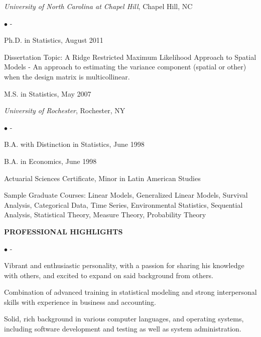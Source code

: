 \documentclass[letterpaper,10pt]{article}
\begin{document}
{\em University of North Carolina at Chapel Hill}, Chapel Hill, NC
\begin{list}{$\bullet$}{\itemsep -5pt \topsep -\parskip}
\item Ph.D. in Statistics, August 2011
\item Dissertation Topic: A Ridge Restricted Maximum Likelihood
  Approach to Spatial Models - An approach to estimating the variance
  component (spatial or other) when the design matrix is multicollinear.
\item M.S. in Statistics, May 2007
\end{list} 

{\em University of Rochester}, Rochester, NY
\begin{list}{$\bullet$}{\itemsep -5pt \topsep -\parskip}
\item B.A. with Distinction in Statistics, June 1998
\item B.A. in Economics, June 1998
\item Actuarial Sciences Certificate, Minor in Latin American Studies
\end{list} 


Sample Graduate Courses: Linear Models,
Generalized Linear Models, Survival Analysis, Categorical Data, Time
Series, Environmental Statistics, Sequential Analysis, Statistical
Theory, Measure Theory, Probability Theory 

\begin{center} {\large \textbf{PROFESSIONAL HIGHLIGHTS}}\\ \vspace{-10pt}{\centering
\rule{1\columnwidth}{0.2pt}\par}
\end{center}
\vspace{-2pt}

\begin{list}{$\bullet$}{\itemsep -5pt \topsep -\parskip}
\item Vibrant and enthusiastic personality, with a passion for sharing
  his knowledge with others, and excited to expand on said background
  from others.
\item Combination of advanced training in statistical modeling and
  strong interpersonal skills with experience in business and
  accounting.
\item Solid, rich background in various computer languages, and operating
  systems, including software development and testing as well as
  system administration.
\end{list}
\end{document}
